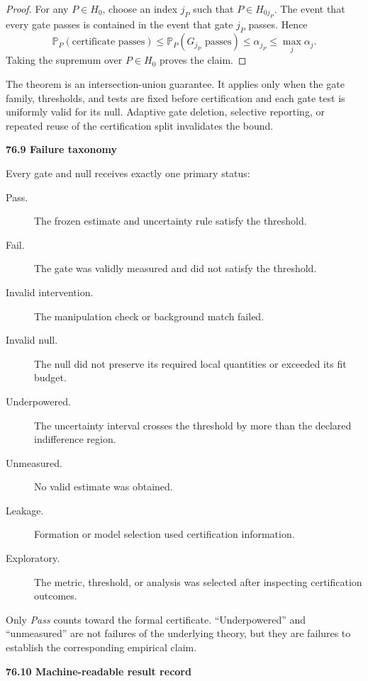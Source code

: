 \documentclass[11pt,letterpaper]{article}
\newcommand{\subtopic}[1]{%
 \vspace{0.45em}
 {\bfseries\color{AccentColor} #1\par}
}
\theoremstyle{plain}
\theoremstyle{definition}
\begin{document}
\begin{proof}
For any \(P\in H_0\), choose an index \(j_P\) such that \(P\in H_{0j_P}\).
The event that every gate passes is contained in the event that gate \(j_P\)
passes. Hence
\[
\mathbb P_P(\text{certificate passes})
\leq
\mathbb P_P(G_{j_P}\text{ passes})
\leq
\alpha_{j_P}
\leq
\max_j\alpha_j.
\]
Taking the supremum over \(P\in H_0\) proves the claim.
\end{proof}

The theorem is an intersection-union guarantee. It applies only when the gate
family, thresholds, and tests are fixed before certification and each gate test
is uniformly valid for its null. Adaptive gate deletion, selective reporting,
or repeated reuse of the certification split invalidates the bound.

\subtopic{76.9 Failure taxonomy}

Every gate and null receives exactly one primary status:
\begin{description}
\item[Pass.] The frozen estimate and uncertainty rule satisfy the threshold.
\item[Fail.] The gate was validly measured and did not satisfy the threshold.
\item[Invalid intervention.] The manipulation check or background match
 failed.
\item[Invalid null.] The null did not preserve its required local quantities
 or exceeded its fit budget.
\item[Underpowered.] The uncertainty interval crosses the threshold by more
 than the declared indifference region.
\item[Unmeasured.] No valid estimate was obtained.
\item[Leakage.] Formation or model selection used certification information.
\item[Exploratory.] The metric, threshold, or analysis was selected after
 inspecting certification outcomes.
\end{description}
Only \emph{Pass} counts toward the formal certificate. ``Underpowered'' and
``unmeasured'' are not failures of the underlying theory, but they are failures
to establish the corresponding empirical claim.

\subtopic{76.10 Machine-readable result record}
\end{document}
